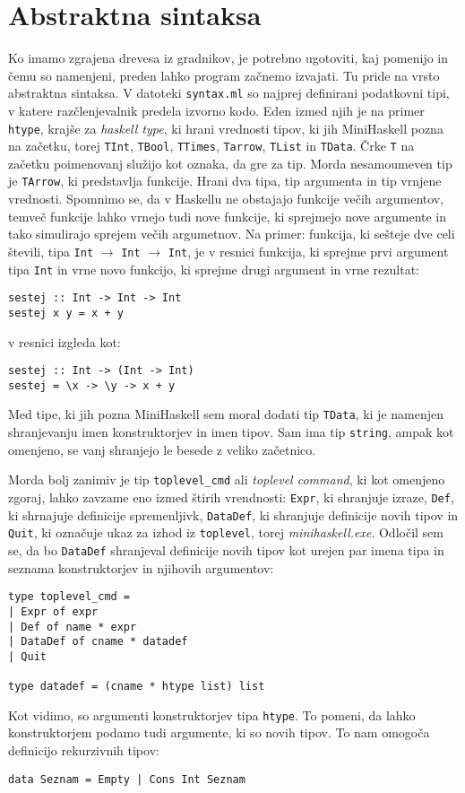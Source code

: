 \documentclass[12pt,a4paper,openany]{book}
\begin{document}
\section{Abstraktna sintaksa}
Ko imamo zgrajena drevesa iz gradnikov, je potrebno ugotoviti, kaj pomenijo in čemu so namenjeni, preden lahko program začnemo izvajati. Tu pride na vrsto abstraktna sintaksa. 
V datoteki \lstinline{syntax.ml} so najprej definirani podatkovni tipi, v katere razčlenjevalnik predela izvorno kodo. Eden izmed njih je na primer 
\lstinline{htype}, krajše za \textit{haskell type}, ki hrani vrednosti tipov, ki jih MiniHaskell pozna na začetku, torej \lstinline{TInt}, \lstinline{TBool}, \lstinline{TTimes}, \lstinline{Tarrow}, \lstinline{TList} in 
\lstinline{TData}. Črke \lstinline{T} na začetku poimenovanj služijo kot oznaka, da gre za tip. Morda nesamoumeven tip je \lstinline{TArrow}, ki predstavlja funkcije. Hrani dva tipa, tip argumenta
in tip vrnjene vrednosti. Spomnimo se, da v Haskellu ne obstajajo funkcije večih argumentov, temveč funkcije lahko vrnejo tudi nove funkcije, ki sprejmejo nove argumente in tako 
simulirajo sprejem večih argumetnov. Na primer: funkcija, ki sešteje dve celi števili, tipa \lstinline{Int} $\rightarrow$ \lstinline{Int} $\rightarrow$ \lstinline{Int}, je v resnici funkcija, ki sprejme prvi argument tipa \lstinline{Int}
in vrne novo funkcijo, ki sprejme drugi argument in vrne rezultat:
\begin{lstlisting}
sestej :: Int -> Int -> Int
sestej x y = x + y
\end{lstlisting}
v resnici izgleda kot:
\begin{lstlisting}
sestej :: Int -> (Int -> Int)
sestej = \x -> \y -> x + y
\end{lstlisting}
Med tipe, ki jih pozna MiniHaskell sem moral dodati tip \lstinline{TData}, ki je namenjen shranjevanju imen konstruktorjev in imen tipov. Sam ima tip \lstinline{string}, ampak kot omenjeno, 
se vanj shranjejo le besede z veliko začetnico. 

Morda bolj zanimiv je tip \lstinline{toplevel_cmd} ali \textit{toplevel command}, ki kot omenjeno zgoraj, lahko zavzame eno izmed štirih vrendnosti: \lstinline{Expr}, ki shranjuje izraze, 
\lstinline{Def}, ki shrnajuje definicije spremenljivk, \lstinline{DataDef}, ki shranjuje definicije novih tipov in \lstinline{Quit}, ki označuje ukaz za izhod iz \lstinline{toplevel}, torej 
\emph{minihaskell.exe}. Odločil sem se, da bo \lstinline{DataDef} shranjeval definicije novih tipov kot urejen par imena tipa in seznama konstruktorjev in njihovih argumentov:
\begin{lstlisting}
type toplevel_cmd =
| Expr of expr
| Def of name * expr
| DataDef of cname * datadef
| Quit

type datadef = (cname * htype list) list
\end{lstlisting}
Kot vidimo, so argumenti konstruktorjev tipa \lstinline{htype}. To pomeni, da lahko konstruktorjem podamo tudi argumente, ki so novih tipov. To nam omogoča definicijo rekurzivnih tipov:
\begin{lstlisting}
data Seznam = Empty | Cons Int Seznam
\end{lstlisting}
\end{document}
